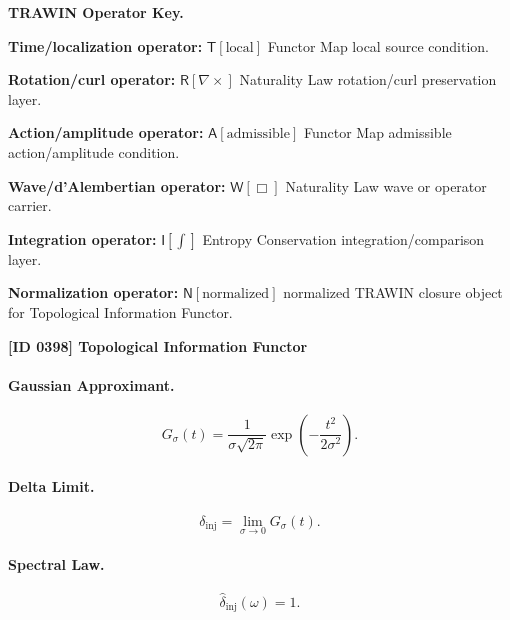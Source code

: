 \par\vspace{0.45\baselineskip}
\noindent\begin{minipage}[t]{\linewidth}
\begingroup
\small
\raggedright
\textbf{TRAWIN Operator Key.}\par
\noindent\textbf{Time/localization operator:} $\mathsf{T}\!\left[\mathrm{local}\right]$ Functor Map local source condition.\par
\noindent\textbf{Rotation/curl operator:} $\mathsf{R}\!\left[\nabla\times\right]$ Naturality Law rotation/curl preservation layer.\par
\noindent\textbf{Action/amplitude operator:} $\mathsf{A}\!\left[\mathrm{admissible}\right]$ Functor Map admissible action/amplitude condition.\par
\noindent\textbf{Wave/d'Alembertian operator:} $\mathsf{W}\!\left[\Box\right]$ Naturality Law wave or operator carrier.\par
\noindent\textbf{Integration operator:} $\mathsf{I}\!\left[\int\right]$ Entropy Conservation integration/comparison layer.\par
\noindent\textbf{Normalization operator:} $\mathsf{N}\!\left[\mathrm{normalized}\right]$ normalized TRAWIN closure object for Topological Information Functor.\par
\endgroup
\end{minipage}

\clearpage
\noindent\textbf{[ID 0398] Topological Information Functor}\par
\vspace{0.35em}
\paragraph{Gaussian Approximant.}
\begin{equation}
G_{\sigma}(t)
=
\frac{1}{\sigma\sqrt{2\pi}}
\exp\left(
-\frac{t^2}{2\sigma^2}
\right).
\end{equation}

\paragraph{Delta Limit.}
\begin{equation}
\delta_{\mathrm{inj}}
=
\lim_{\sigma\to0}G_{\sigma}(t).
\end{equation}

\paragraph{Spectral Law.}
\begin{equation}
\widehat{\delta}_{\mathrm{inj}}(\omega)=1.
\end{equation}

